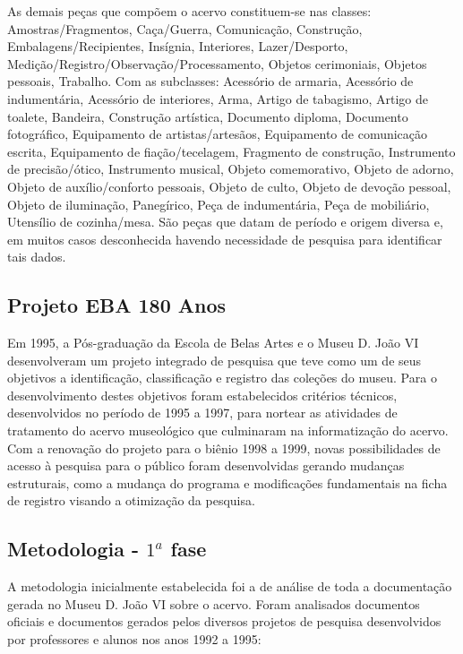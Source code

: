 As demais peças que compõem o acervo constituem-se nas classes: Amostras/Fragmentos, Caça/Guerra, Comunicação, Construção, Embalagens/Recipientes, Insígnia, Interiores, Lazer/Desporto, Medição/Registro/Observação/Processamento, Objetos cerimoniais, Objetos pessoais, Trabalho. Com as subclasses: Acessório de armaria, Acessório de indumentária, Acessório de interiores, Arma, Artigo de tabagismo, Artigo de toalete, Bandeira, Construção artística, Documento diploma, Documento fotográfico, Equipamento de artistas/artesãos, Equipamento de comunicação escrita, Equipamento de fiação/tecelagem, Fragmento de construção, Instrumento de precisão/ótico, Instrumento musical, Objeto comemorativo, Objeto de adorno, Objeto de auxílio/conforto pessoais, Objeto de culto, Objeto de devoção pessoal, Objeto de iluminação, Panegírico, Peça de indumentária, Peça de mobiliário, Utensílio de cozinha/mesa. São peças que datam de período e origem diversa e, em muitos casos desconhecida havendo necessidade de pesquisa para identificar tais dados.

\subsection{Projeto EBA 180 Anos}

Em 1995, a Pós-graduação da Escola de Belas Artes e o Museu D. João VI desenvolveram um projeto integrado de pesquisa que teve como um de seus objetivos a identificação, classificação e registro das coleções do museu. Para o desenvolvimento destes objetivos foram estabelecidos critérios técnicos, desenvolvidos no período de 1995 a 1997, para nortear as atividades de tratamento do acervo museológico que culminaram na informatização do acervo. Com a renovação do projeto para o biênio 1998 a 1999, novas possibilidades de acesso à pesquisa para o público foram desenvolvidas gerando mudanças estruturais, como a mudança do programa e modificações fundamentais na ficha de registro visando a otimização da pesquisa.

\subsection{Metodologia - $1^a$ fase}

A metodologia inicialmente estabelecida foi a de análise de toda a documentação gerada no Museu D. João VI sobre o acervo. Foram analisados documentos oficiais e documentos gerados pelos diversos projetos de pesquisa desenvolvidos por professores e alunos nos anos 1992 a 1995:

